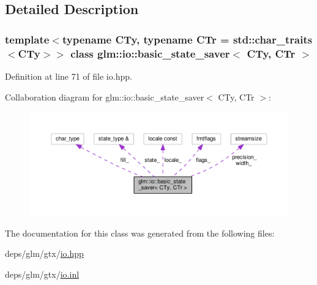 \subsection{Detailed Description}
\subsubsection*{template$<$typename C\+Ty, typename C\+Tr = std\+::char\+\_\+traits$<$\+C\+Ty$>$$>$\newline
class glm\+::io\+::basic\+\_\+state\+\_\+saver$<$ C\+Ty, C\+Tr $>$}



Definition at line 71 of file io.\+hpp.



Collaboration diagram for glm\+:\+:io\+:\+:basic\+\_\+state\+\_\+saver$<$ C\+Ty, C\+Tr $>$\+:
\nopagebreak
\begin{figure}[H]
\begin{center}
\leavevmode
\includegraphics[width=350pt]{dd/d1c/classglm_1_1io_1_1basic__state__saver__coll__graph}
\end{center}
\end{figure}


The documentation for this class was generated from the following files\+:\begin{DoxyCompactItemize}
\item 
deps/glm/gtx/\hyperlink{io_8hpp}{io.\+hpp}\item 
deps/glm/gtx/\hyperlink{io_8inl}{io.\+inl}\end{DoxyCompactItemize}
